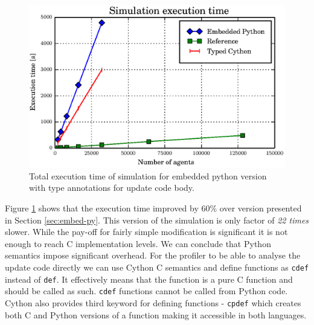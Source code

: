 \documentclass[12pt, a4paper]{report}
\begin{document}
\begin{figure}[H]
  \begin{center}
    \includegraphics[width=\columnwidth]{graphs/cython-typed-perf.eps}
    \caption{Total execution time of simulation for embedded python version with type
    annotations for update code body.}
    \label{fig:cython-typed-perf}
  \end{center}
\end{figure}

Figure \ref{fig:cython-typed-perf} shows that the execution time improved by 60\%
over version presented in Section \ref{sec:embed-py}.
This version of the simulation is only factor of \emph{22 times} slower.
While the pay-off for fairly simple modification is significant it is not enough
to reach C implementation levels.
We can conclude that Python semantics impose significant overhead.
For the profiler to be able to analyse the update code directly we can use Cython
C semantics and define functions as \lstinline{cdef} instead of \lstinline{def}.
It effectively means that the function is a pure C function and should be called
as such. \lstinline{cdef} functions cannot be called from Python code.
Cython also provides third keyword for defining functions - \lstinline{cpdef}
which creates both C and Python versions of a function making it accessible in both
languages.
\end{document}
